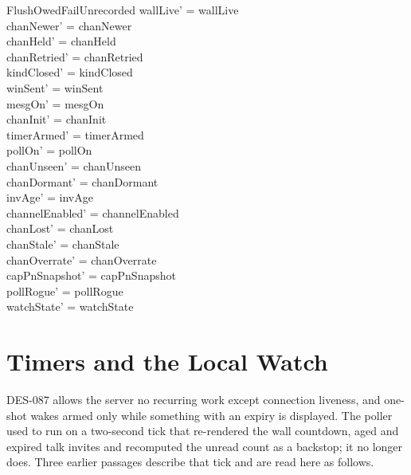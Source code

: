 \documentclass[a4paper,10pt,fleqn]{article}
\begin{document}
\begin{schema}{FlushOwedFailUnrecorded}
  wallLive' = wallLive \\
  chanNewer' = chanNewer \\
  chanHeld' = chanHeld \\
  chanRetried' = chanRetried \\
  kindClosed' = kindClosed \\
  winSent' = winSent \\
  mesgOn' = mesgOn \\
  chanInit' = chanInit \\
  timerArmed' = timerArmed \\
  pollOn' = pollOn \\
  chanUnseen' = chanUnseen \\
  chanDormant' = chanDormant \\
  invAge' = invAge \\
  channelEnabled' = channelEnabled \\
  chanLost' = chanLost \\
  chanStale' = chanStale \\
  chanOverrate' = chanOverrate \\
  capPnSnapshot' = capPnSnapshot \\
  pollRogue' = pollRogue \\
  watchState' = watchState
\end{schema}

\section{Timers and the Local Watch}
\label{sec:timers}

DES-087 allows the server no recurring work except connection liveness, and
one-shot wakes armed only while something with an expiry is displayed.  The
poller used to run on a two-second tick that re-rendered the wall countdown,
aged and expired talk invites and recomputed the unread count as a backstop;
it no longer does.  Three earlier passages describe that tick and are read
here as follows.
\end{document}
